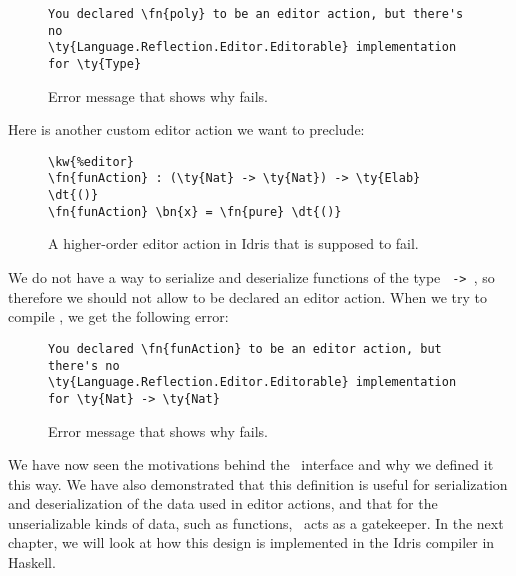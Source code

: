 \begin{figure}[ht]
  \caption{Error message that shows why  fails.}
\begin{Verbatim}[framesep=2mm, label=\footnotesize{\normalfont{Idris error message}}, labelposition=topline]
You declared \fn{poly} to be an editor action, but there's no
\ty{Language.Reflection.Editor.Editorable} implementation for \ty{Type}
\end{Verbatim}
\end{figure}

Here is another custom editor action we want to preclude:

\begin{figure}[ht]
  \caption{A higher-order editor action  in Idris that is supposed to fail.}
\begin{Verbatim}[framesep=2mm, label=\footnotesize{\normalfont{Idris}}, labelposition=topline]
\kw{%editor}
\fn{funAction} : (\ty{Nat} -> \ty{Nat}) -> \ty{Elab} \dt{()}
\fn{funAction} \bn{x} = \fn{pure} \dt{()}
\end{Verbatim}
\end{figure}

We do not have a way to serialize and deserialize functions of the type
\texttt{ -> }, so therefore we should not allow 
to be declared an editor action.
When we try to compile , we get the following error:

\begin{figure}[ht]
  \caption{Error message that shows why  fails.}
\begin{Verbatim}[framesep=2mm, label=\footnotesize{\normalfont{Idris error message}}, labelposition=topline]
You declared \fn{funAction} to be an editor action, but there's no
\ty{Language.Reflection.Editor.Editorable} implementation for \ty{Nat} -> \ty{Nat}
\end{Verbatim}
\end{figure}

We have now seen the motivations behind the \Editorable\ interface and
why we defined it this way. We have also demonstrated that this definition
is useful for serialization and deserialization of the data used in editor
actions, and that for the unserializable kinds of data, such as functions,
\Editorable\ acts as a gatekeeper. In the next chapter, we will look at how
this design is implemented in the Idris compiler in Haskell.
